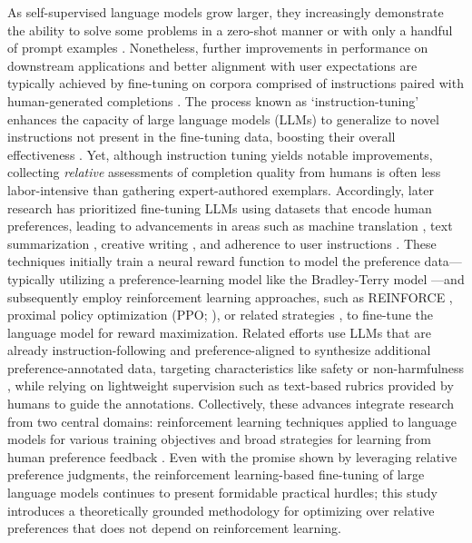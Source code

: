 As self-supervised language models grow larger, they increasingly demonstrate the ability to solve some problems in a zero-shot manner \citep{radford2019language} or with only a handful of prompt examples \citep{gpt3,megatron,chowdhery2022palm}. Nonetheless, further improvements in performance on downstream applications and better alignment with user expectations are typically achieved by fine-tuning on corpora comprised of instructions paired with human-generated completions \citep{mishra-etal-2022-cross,sanh2022multitask,chung2022scaling,thoppilan2022lamda}. The process known as `instruction-tuning’ enhances the capacity of large language models (LLMs) to generalize to novel instructions not present in the fine-tuning data, boosting their overall effectiveness \citep{chung2022scaling}. Yet, although instruction tuning yields notable improvements, collecting \textit{relative} assessments of completion quality from humans is often less labor-intensive than gathering expert-authored exemplars. Accordingly, later research has prioritized fine-tuning LLMs using datasets that encode human preferences, leading to advancements in areas such as machine translation \citep{kreutzer-etal-2018-reliability}, text summarization \citep{stiennon2022learning,ziegler2020finetuning}, creative writing \citep{ziegler2020finetuning}, and adherence to user instructions \citep{ouyang2022training,ramamurthy2023is}. These techniques initially train a neural reward function to model the preference data—typically utilizing a preference-learning model like the Bradley-Terry model \citep{bradley1952rankanalysis}—and subsequently employ reinforcement learning approaches, such as REINFORCE \citep{williams1992reinforce}, proximal policy optimization (PPO; \cite{schulman2017proximal}), or related strategies \citep{ramamurthy2023is}, to fine-tune the language model for reward maximization. Related efforts use LLMs that are already instruction-following and preference-aligned to synthesize additional preference-annotated data, targeting characteristics like safety or non-harmfulness \citep{bai2022constitutional}, while relying on lightweight supervision such as text-based rubrics provided by humans to guide the annotations. Collectively, these advances integrate research from two central domains: reinforcement learning techniques applied to language models for various training objectives \citep{Ranzato2015SequenceLT,paulus2018a,wu2018learning} and broad strategies for learning from human preference feedback \citep{christiano2017deep,kupcsik2018learning}. Even with the promise shown by leveraging relative preference judgments, the reinforcement learning-based fine-tuning of large language models continues to present formidable practical hurdles; this study introduces a theoretically grounded methodology for optimizing over relative preferences that does not depend on reinforcement learning.

